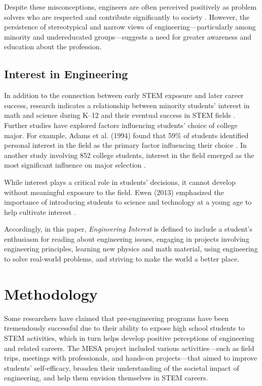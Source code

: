 \documentclass[11pt]{article}
\begin{document}
Despite these misconceptions, engineers are often perceived positively as problem solvers who are respected and contribute significantly to society \cite{marshall2007}. However, the persistence of stereotypical and narrow views of engineering—particularly among minority and undereducated groups—suggests a need for greater awareness and education about the profession.

\subsection{Interest in Engineering}

In addition to the connection between early STEM exposure and later career success, research indicates a relationship between minority students’ interest in math and science during K--12 and their eventual success in STEM fields \cite{museus2011}. Further studies have explored factors influencing students’ choice of college major. For example, Adams et al. (1994) found that 59\% of students identified personal interest in the field as the primary factor influencing their choice \cite{adams1994}. In another study involving 852 college students, interest in the field emerged as the most significant influence on major selection \cite{beggs2008}.

While interest plays a critical role in students' decisions, it cannot develop without meaningful exposure to the field. Ewen (2013) emphasized the importance of introducing students to science and technology at a young age to help cultivate interest \cite{ewen2013}. 

Accordingly, in this paper, \textit{Engineering Interest} is defined to include a student’s enthusiasm for reading about engineering issues, engaging in projects involving engineering principles, learning new physics and math material, using engineering to solve real-world problems, and striving to make the world a better place.

\section{Methodology}

Some researchers have claimed that pre-engineering programs have been tremendously successful \cite{lam2005} due to their ability to expose high school students to STEM activities, which in turn helps develop positive perceptions of engineering and related careers. The MESA project included various activities—such as field trips, meetings with professionals, and hands-on projects—that aimed to improve students’ self-efficacy, broaden their understanding of the societal impact of engineering, and help them envision themselves in STEM careers.
\end{document}
